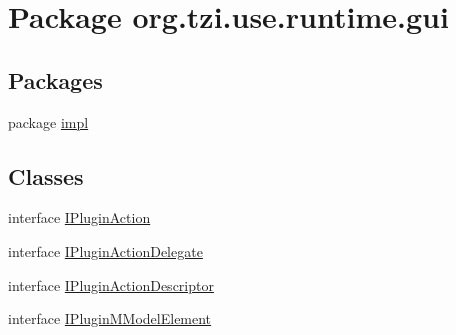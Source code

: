 \hypertarget{namespaceorg_1_1tzi_1_1use_1_1runtime_1_1gui}{\section{Package org.\-tzi.\-use.\-runtime.\-gui}
\label{namespaceorg_1_1tzi_1_1use_1_1runtime_1_1gui}
}
\subsection*{Packages}
\begin{DoxyCompactItemize}
\item 
package \hyperlink{namespaceorg_1_1tzi_1_1use_1_1runtime_1_1gui_1_1impl}{impl}
\end{DoxyCompactItemize}
\subsection*{Classes}
\begin{DoxyCompactItemize}
\item 
interface \hyperlink{interfaceorg_1_1tzi_1_1use_1_1runtime_1_1gui_1_1_i_plugin_action}{I\-Plugin\-Action}
\item 
interface \hyperlink{interfaceorg_1_1tzi_1_1use_1_1runtime_1_1gui_1_1_i_plugin_action_delegate}{I\-Plugin\-Action\-Delegate}
\item 
interface \hyperlink{interfaceorg_1_1tzi_1_1use_1_1runtime_1_1gui_1_1_i_plugin_action_descriptor}{I\-Plugin\-Action\-Descriptor}
\item 
interface \hyperlink{interfaceorg_1_1tzi_1_1use_1_1runtime_1_1gui_1_1_i_plugin_m_model_element}{I\-Plugin\-M\-Model\-Element}
\end{DoxyCompactItemize}
